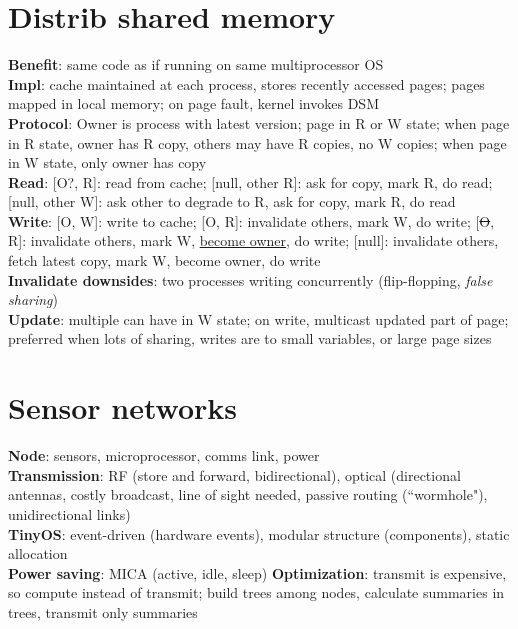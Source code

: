 \documentclass{article}
\begin{document}
\begin{multicols*}{3}
\section{Distrib shared memory}
\textbf{Benefit}: same code as if running on same multiprocessor OS \\
\textbf{Impl}: cache maintained at each process, stores recently accessed pages; pages mapped in local memory; on page fault, kernel invokes DSM \\
\textbf{Protocol}: Owner is process with latest version; page in R or W state; when page in R state, owner has R copy, others may have R copies, no W copies; when page in W state, only owner has copy \\
\textbf{Read}: [O?, R]: read from cache; [null, other R]: ask for copy, mark R, do read; [null, other W]: ask other to degrade to R, ask for copy, mark R, do read \\
\textbf{Write}: [O, W]: write to cache; [O, R]: invalidate others, mark W, do write; [\sout{O}, R]: invalidate others, mark W, \underline{become owner}, do write; [null]: invalidate others, fetch latest copy, mark W, become owner, do write \\
\textbf{Invalidate downsides}: two processes writing concurrently (flip-flopping, \textit{false sharing}) \\
\textbf{Update}: multiple can have in W state; on write, multicast updated part of page; preferred when lots of sharing, writes are to small variables, or large page sizes

\section{Sensor networks}
\textbf{Node}: sensors, microprocessor, comms link, power \\
\textbf{Transmission}: RF (store and forward, bidirectional), optical (directional antennas, costly broadcast, line of sight needed, passive routing (``wormhole"), unidirectional links) \\
\textbf{TinyOS}: event-driven (hardware events), modular structure (components), static allocation \\
\textbf{Power saving}: MICA (active, idle, sleep)
\textbf{Optimization}: transmit is expensive, so compute instead of transmit; build trees among nodes, calculate summaries in trees, transmit only summaries


\end{multicols*}
\end{document}
